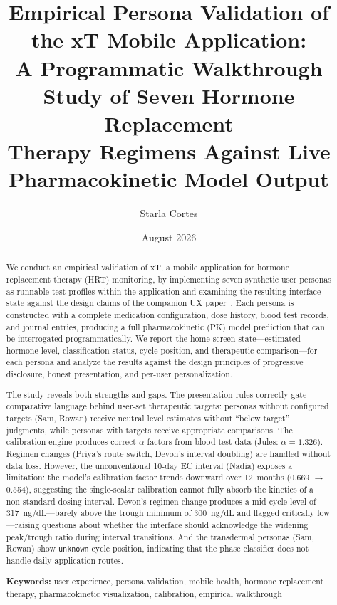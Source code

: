 \documentclass[11pt,a4paper]{article}
\title{\textbf{Empirical Persona Validation of the xT Mobile Application:}\\[0.3em]
\large A Programmatic Walkthrough Study of Seven Hormone Replacement\\
Therapy Regimens Against Live Pharmacokinetic Model Output}
\author{Starla Cortes}
\date{August 2026}
\newcommand{\code}[1]{\texttt{\small #1}}
\begin{document}
\maketitle

\begin{abstract}
\noindent
We conduct an empirical validation of xT, a mobile application for hormone
replacement therapy (HRT) monitoring, by implementing seven synthetic user
personas as runnable test profiles within the application and examining the
resulting interface state against the design claims of the companion UX
paper~\cite{xtux}. Each persona is constructed with a complete medication
configuration, dose history, blood test records, and journal entries,
producing a full pharmacokinetic (PK) model prediction that can be
interrogated programmatically. We report the home screen state---estimated
hormone level, classification status, cycle position, and therapeutic
comparison---for each persona and analyze the results against the design
principles of progressive disclosure, honest presentation, and per-user
personalization.

The study reveals both strengths and gaps. The presentation rules correctly
gate comparative language behind user-set therapeutic targets: personas
without configured targets (Sam, Rowan) receive neutral level estimates
without ``below target'' judgments, while personas with targets receive
appropriate comparisons. The calibration engine produces correct $\alpha$
factors from blood test data (Jules: $\alpha = 1.326$). Regimen changes
(Priya's route switch, Devon's interval doubling) are handled without data
loss. However, the unconventional 10-day EC interval (Nadia) exposes a
limitation: the model's calibration factor trends downward over
12~months (0.669 $\rightarrow$ 0.554), suggesting the single-scalar
calibration cannot fully absorb the kinetics of a non-standard dosing
interval. Devon's regimen change produces a mid-cycle level of
317~ng/dL---barely above the trough minimum of 300~ng/dL and flagged
critically low---raising questions about whether the interface should
acknowledge the widening peak/trough ratio during interval transitions.
And the transdermal personas (Sam, Rowan) show \code{unknown} cycle
position, indicating that the phase classifier does not handle daily-application
routes.

\textbf{Keywords:} user experience, persona validation, mobile health,
hormone replacement therapy, pharmacokinetic visualization, calibration,
empirical walkthrough
\end{abstract}
\end{document}
